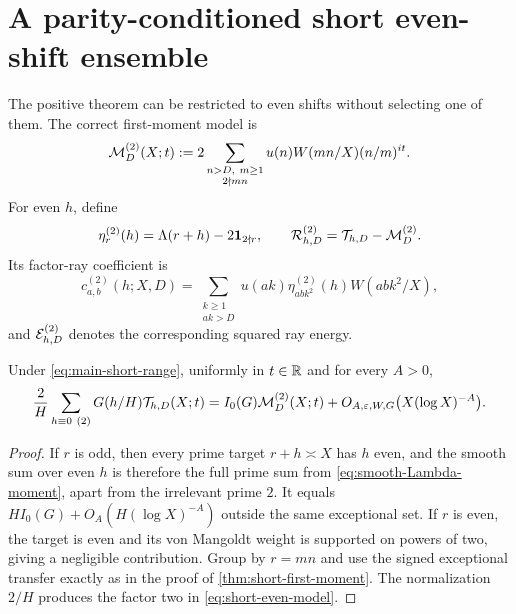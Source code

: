 \section{A parity-conditioned short even-shift ensemble}
\label{sec:even-shifts}

The positive theorem can be restricted to even shifts without selecting
one of them.  The correct first-moment model is
\begin{equation}
 \mathcal M_D^{(2)}(X;t)
 :=2\sum_{\substack{n>D,\ m\geq1\\2\nmid mn}}
 u(n)W(mn/X)(n/m)^{it}.
 \label{eq:short-even-model}
\end{equation}
For even $h$, define
\begin{equation}
 \eta_r^{(2)}(h)=\Lambda(r+h)-2\mathbf 1_{2\nmid r},
 \qquad
 \mathcal R^{(2)}_{h,D}=\mathcal T_{h,D}-\mathcal M_D^{(2)}.
 \label{eq:short-even-residual}
\end{equation}
Its factor-ray coefficient is
\begin{equation}
 c^{(2)}_{a,b}(h;X,D)=
 \sum_{\substack{k\geq1\\ak>D}}
 u(ak)\eta_{abk^2}^{(2)}(h)W(abk^2/X),
 \label{eq:short-even-ray-coefficient}
\end{equation}
and $\mathcal E^{(2)}_{h,D}$ denotes the corresponding squared ray energy.

\begin{proposition}
\label{prop:short-even-first-moment}
Under \eqref{eq:main-short-range}, uniformly in $t\in\mathbb R$ and for every
$A>0$,
\begin{equation}
 \frac2H\sum_{h\equiv0\ (2)}G(h/H)\cT_{h,D}(X;t)
 =I_0(G)\cM_D^{(2)}(X;t)
 +O_{A,\eps,W,G}\bigl(X(\log X)^{-A}\bigr).
 \label{eq:short-even-first-moment}
\end{equation}
\end{proposition}

\begin{proof}
If $r$ is odd, then every prime target $r+h\asymp X$ has $h$ even, and
the smooth sum over even $h$ is therefore the full prime sum from
\eqref{eq:smooth-Lambda-moment}, apart from the irrelevant prime $2$.
It equals $HI_0(G)+O_A(H(\log X)^{-A})$ outside the same exceptional
set.  If $r$ is even, the target is even and its von Mangoldt weight is
supported on powers of two, giving a negligible contribution.  Group by
$r=mn$ and use the signed exceptional transfer exactly as in the proof of
\cref{thm:short-first-moment}.  The normalization $2/H$ produces the
factor two in \eqref{eq:short-even-model}.
\end{proof}

